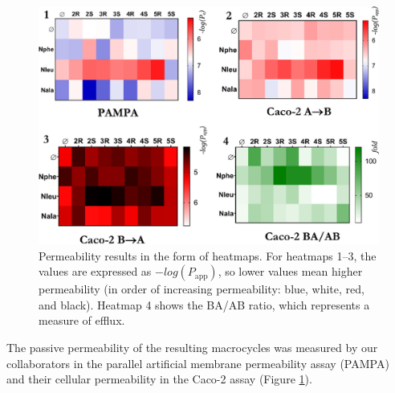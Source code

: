 \begin{figure}[h!]
    \centering
    \includegraphics[width=\textwidth]{7_chapter_5/fig/intro/pampa.jpeg}
    \caption{Permeability results in the form of heatmaps. For heatmaps 1–3, the values are expressed as $−log(P_{\text{app}})$, so lower values mean higher permeability (in order of increasing permeability: blue, white, red, and black). Heatmap 4 shows the BA/AB ratio, which represents a measure of efflux.}
    \label{fig:permAssays}
\end{figure}
The passive permeability of the resulting macrocycles was measured by our collaborators in the parallel artificial membrane permeability assay (PAMPA) and their cellular permeability in the Caco-2 assay\cite{Di2015} (Figure \ref{fig:permAssays}).\cite{Comeau2021}

